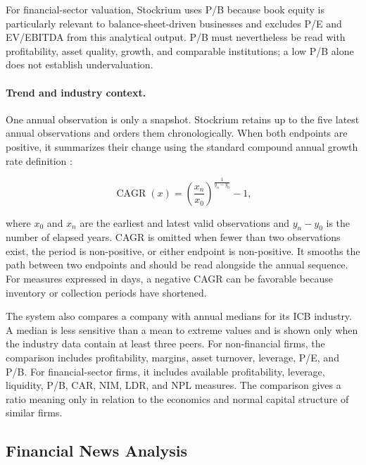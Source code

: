For financial-sector valuation, Stockrium uses P/B because book equity is particularly relevant to balance-sheet-driven businesses and excludes P/E and EV/EBITDA from this analytical output. P/B must nevertheless be read with profitability, asset quality, growth, and comparable institutions; a low P/B alone does not establish undervaluation.

\paragraph{Trend and industry context.}

One annual observation is only a snapshot. Stockrium retains up to the five latest annual observations and orders them chronologically. When both endpoints are positive, it summarizes their change using the standard compound annual growth rate definition \cite{damodaranHistoricalGrowth2026}:

\begin{equation}
    \operatorname{CAGR}(x)
      =\left(\frac{x_n}{x_0}\right)^{\frac{1}{y_n-y_0}}-1,
    \label{eq:fundamental-cagr-foundation}
\end{equation}

where $x_0$ and $x_n$ are the earliest and latest valid observations and $y_n-y_0$ is the number of elapsed years. CAGR is omitted when fewer than two observations exist, the period is non-positive, or either endpoint is non-positive. It smooths the path between two endpoints and should be read alongside the annual sequence. For measures expressed in days, a negative CAGR can be favorable because inventory or collection periods have shortened.

The system also compares a company with annual medians for its ICB industry. A median is less sensitive than a mean to extreme values and is shown only when the industry data contain at least three peers. For non-financial firms, the comparison includes profitability, margins, asset turnover, leverage, P/E, and P/B. For financial-sector firms, it includes available profitability, leverage, liquidity, P/B, CAR, NIM, LDR, and NPL measures. The comparison gives a ratio meaning only in relation to the economics and normal capital structure of similar firms.

\subsection{Financial News Analysis}
\label{subsec:financial-news-analysis-foundations}

